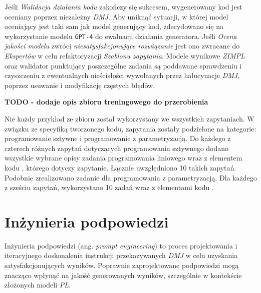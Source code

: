 Jeśli \textit{Walidacja działania kodu} zakończy się sukcesem, wygenerowany kod jest oceniany poprzez niezależny \textit{DMJ}. Aby uniknąć sytuacji, w której model oceniający jest taki sam jak model generujący kod, zdecydowano się na wykorzystanie modelu \texttt{GPT-4} do ewaluacji działania generatora. Jeśli \textit{Ocena jakości modelu} zwróci \textit{niesatysfakcjonujące rozwiązanie} jest ono zwracane do \textit{Ekspertów} w celu refaktoryzacji \textit{Szablonu zapytania}. Modele wynikowe \textit{ZIMPL} oraz walidator punktujący poszczególne zadania są poddawane sprawdzeniu i czyszczeniu z ewentualnych nieścisłości wywołanych przez halucynacje \textit{DMJ}, poprzez usuwanie i modyfikację częstych błędów.


\textbf{TODO - dodaje opis zbioru treningowego do przerobienia}

Nie każdy przykład ze zbioru został wykorzystany we wszystkich zapytaniach. W związku ze specyfiką tworzonego kodu, zapytania zostały podzielone na kategorie: programowanie sztywne i programowanie z parametryzacją. Do każdego z czterech różnych zapytań dotyczących programowania sztywnego %
dodano wszystkie wybrane opisy zadania programowania liniowego
wraz z elementem kodu  , którego dotyczy zapytanie. Łącznie uwzględniono 10 takich zapytań. Podobnie zrealizowano zadanie dla programowania z parametryzacją. Dla każdego z sześciu zapytań, wykorzystano 10 zadań wraz z elementami kodu  . %


\section{Inżynieria podpowiedzi}
Inżynieria podpowiedzi (ang. \textit{prompt engineering}) to proces projektowania i iteracyjnego doskonalenia instrukcji przekazywanych \textit{DMJ} w celu uzyskania satysfakcjonujących wyników. Poprawnie zaprojektowane podpowiedzi mogą znacząco wpłynąć na jakość generowanych wyników, szczególnie w kontekście złożonych modeli \textit{PL}.

